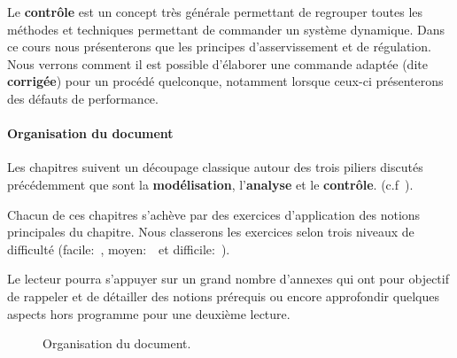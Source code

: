 Le \textbf{contrôle} est un concept très générale permettant de regrouper
toutes les méthodes et techniques permettant de commander un système dynamique.
Dans ce cours nous présenterons que les principes d'asservissement et de 
régulation. Nous verrons comment il est possible d'élaborer une commande 
adaptée (dite \textbf{corrigée}) pour un procédé quelconque, notamment 
lorsque ceux-ci présenterons des défauts de performance.

\paragraph{Organisation du document}
Les chapitres suivent un découpage classique autour des trois piliers 
discutés précédemment que sont la \textbf{modélisation}, l'\textbf{analyse} 
et le \textbf{contrôle}. (c.f~).

Chacun de ces chapitres s'achève par des exercices d'application des 
notions principales du chapitre. Nous classerons les exercices selon 
trois niveaux de difficulté (facile:~\facile, moyen:~\moyen~et 
difficile:~\difficile).

Le lecteur pourra s'appuyer sur un grand nombre d'annexes qui ont pour 
objectif de rappeler et de détailler des notions prérequis ou encore 
approfondir quelques aspects hors programme pour une deuxième lecture.
\begin{figure}[!h]
    \renewcommand\thefigure{A}
    \centering
        {
            \tikzset{external/export=false}
            
        }
    \caption{Organisation du document.\label{fig-diagramme_cours}}
\end{figure}

